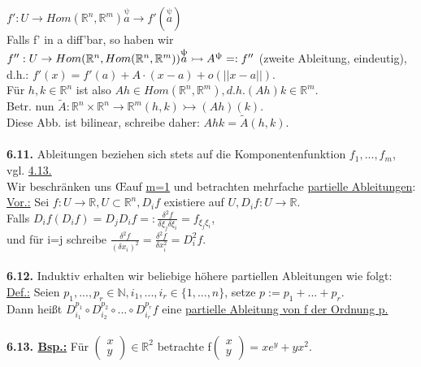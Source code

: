 \documentclass[]{scrartcl}
\begin{document}
$f':U\rightarrow Hom(\mathbb{R}^n,\mathbb{R}^m)\overset{\uppsi}{a}\rightarrow 
f'(\overset{\uppsi}{a})$\\
Falls f' in a diff'bar, so haben wir\\
$f'':U\rightarrow Hom(\mathbb{R}^n,Hom(\mathbb{R}^n,\mathbb{R}^m))\\
\overset{\uppsi}{a}\rightarrowtail A^\uppsi =: f''$ (zweite Ableitung, 
eindeutig), d.h.: $f'(x)=f'(a)+A\cdot(x-a)+o(||x-a||).$\\
Für $h,k\in\mathbb{R}^n$ ist also $Ah \in Hom(\mathbb{R}^n,\mathbb{R}^m), d.h. 
(Ah)k\in\mathbb{R}^m.$\\
Betr. nun $\tilde{A}:\mathbb{R}^n \times \mathbb{R}^n\rightarrow\mathbb{R}^m 
(h,k)\rightarrowtail (Ah)(k).$\\
Diese Abb. ist bilinear, schreibe daher: $Ahk=\tilde{A}(h,k).$\\
\\
\textbf{6.11.} Ableitungen beziehen sich stets auf die Komponentenfunktion 
$f_1,...,f_m$, vgl.  \ul{4.13.}\\
Wir beschränken uns \OE auf \underline{m=1} und betrachten mehrfache 
\underline{partielle Ableitungen}:\\
\underline{Vor.:} Sei $f: U\rightarrow\mathbb{R}, U\subset \mathbb{R}^n, D_if$ 
existiere auf $U, D_if:U\rightarrow \mathbb{R}.$\\
Falls $D_if(D_if)=D_jD_if=:\frac{\delta^2f}{\delta 
\xi_j\delta\xi_i}=f_{\xi_j\xi_i}$,\\
und für i=j schreibe $\frac{\delta^2f}{(\delta x_i)^2}=\frac{\delta^2f}{\delta 
x_i^2}=D_i^2f.$\\
\\
\textbf{6.12.} Induktiv erhalten wir beliebige höhere partiellen Ableitungen 
wie folgt:\\
\underline{Def.:} Seien $p_1,...,p_r\in \mathbb{N}, i_1,...,i_r
\in\{1,...,n\}$, setze $p:=p_1+...+p_r.$\\
Dann heißt \ul{$D_{i_1}^{p_1}\circ 
D_{i_2}^{p_2}\circ...\circ D_{i_r}^{p_r}f$} eine \ul{partielle 
Ableitung von f der Ordnung p.}\\
\\
\textbf{6.13. \underline{Bsp.:}} Für $\begin{pmatrix}
	x\\y
\end{pmatrix}\in \mathbb{R}^2$ betrachte f$\begin{pmatrix}
	x\\y
\end{pmatrix}=xe^y+yx^2.$\\
\end{document}
